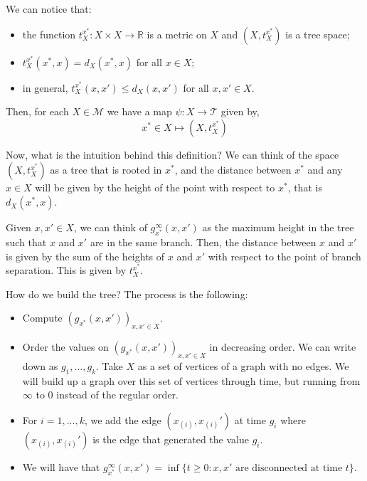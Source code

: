 \documentclass[a4paper,12pt,reqno, english]{amsart}
\newcommand{\R}{\mathbb{R}}
\newcommand{\M}{\mathcal{M}}
\theoremstyle{plain}
\theoremstyle{definition}
\begin{document}
{{We can notice that:

\begin{itemize}
\item the function $t^{x^*}_X: X\times X\rightarrow \R$ is a metric on $X$ and $(X,t^{x^*}_X)$ is a tree space;
\item $t^{x^*}_X(x^*,x)= d_X(x^*,x)$ for all $x\in X$;
\item in general, $t^{x^*}_X(x,x')\leq d_X(x,x')$ for all $x,x'\in X$.
\end{itemize}

Then, for each $X\in\M$ we have a map $\psi:X\rightarrow \mathcal{T}$ given by, 
$$x^*\in X \mapsto (X,t^{x^*}_X)$$


Now, what is the intuition behind this definition? We can think of the space $(X,t^{x^*}_X)$ as a tree that is rooted in $x^*$, and the distance between $x^*$ and any $x\in X$ will be given by the height of the point with respect to $x^*$, that is $d_X(x^*,x)$. 

Given $x,x'\in X$, we can think of $g^{\infty}_{x^*}(x,x')$ as the maximum height in the tree such that $x$ and $x'$ are in the same branch. Then, the distance between $x$ and $x'$ is given by the sum of the heights of $x$ and $x'$ with respect to the point of branch separation. This is given by $t^{x^*}_X$. 

How do we build the tree? The process is the following:
\begin{itemize}
	\item Compute $(g_{x^*}(x,x'))_{x,x'\in X}$.
    \item Order the values on $(g_{x^*}(x,x'))_{x,x'\in X}$ in decreasing order. We can write down as $g_1,...,g_k$. Take $X$ as a set of vertices of a graph with no edges. We will build up a graph over this set of vertices through time, but running from $\infty$ to $0$ instead of the regular order.
    \item For $i=1,...,k$, we add the edge $(x_{(i)},x_{(i)}')$ at time $g_i$ where $(x_{(i)},x_{(i)}')$ is the edge that generated the value $g_i$.
    \item We will have that $g^\infty_{x^*}(x,x')=\inf\{t\geq 0 : x, x' \text{ are disconnected at time }t \}$.
\end{itemize}

\begin{figure}
\centering
{}
\end{figure}}}
\end{document}
